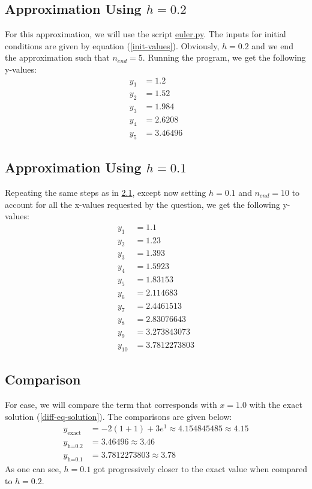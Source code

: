 \documentclass{article}
\begin{document}
\subsection{Approximation Using $h=0.2$}
\label{sec:2.1}
For this approximation, we will use the script \href{https://github.com/colinmc513/approximation-scripts/blob/main/euler.py}{euler.py}. The inputs for initial conditions are given by equation (\ref{init-values}). Obviously, $h = 0.2$ and we end the approximation such that $n_{end} = 5$. Running the program, we get the following y-values:
\begin{equation*}
    \begin{split}
        y_1 &= 1.2 \\
        y_2 &= 1.52 \\
        y_3 &= 1.984 \\
        y_4 &= 2.6208 \\
        y_5 &= 3.46496 
    \end{split}
\end{equation*}
\subsection{Approximation Using $h=0.1$}
Repeating the same steps as in \hyperref[sec:2.1]{2.1}, except now setting $h=0.1$ and $n_{end} = 10$ to account for all the x-values requested by the question, we get the following y-values:
\begin{equation*}
    \begin{split}
        y_1 &= 1.1 \\
        y_2 &= 1.23 \\
        y_3 &= 1.393 \\
        y_4 &= 1.5923 \\
        y_5 &= 1.83153 \\
        y_6 &= 2.114683 \\
        y_7 &= 2.4461513 \\
        y_8 &= 2.83076643 \\
        y_9 &= 3.273843073 \\
        y_{10} &= 3.7812273803 
    \end{split}
\end{equation*}
\subsection{Comparison}
\label{sec:2.3}
For ease, we will compare the term that corresponds with $x=1.0$ with the exact solution (\ref{diff-eq-solution}). The comparisons are given below:
\begin{equation*}
    \begin{split}
        y_{\text{exact}} &= -2(1+1)+3e^1 \approx 4.154845485 \approx 4.15 \\
        y_{\text{h=0.2}} &= 3.46496 \approx 3.46 \\
        y_{\text{h=0.1}} &= 3.7812273803 \approx 3.78
    \end{split}
\end{equation*}
As one can see, $h=0.1$ got progressively closer to the exact value when compared to $h=0.2$.
\end{document}
